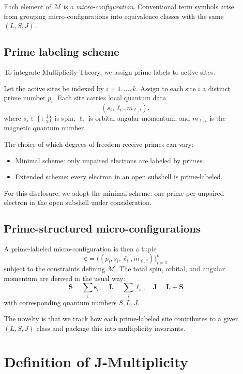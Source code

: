 \documentclass[11pt]{article}
\begin{document}
Each element of \(\mathcal{M}\) is a \emph{micro-configuration}. Conventional term symbols arise from grouping micro-configurations into equivalence classes with the same \((L,S,J)\).

\subsection{Prime labeling scheme}

To integrate Multiplicity Theory, we assign prime labels to active sites.

\begin{definition}
Let the active sites be indexed by \(i=1,\dots,k\). Assign to each site \(i\) a distinct prime number \(p_i\). Each site carries local quantum data
\[
(s_i, \ell_i, m_{\ell,i}),
\]
where \(s_i \in \{\pm \frac{1}{2}\}\) is spin, \(\ell_i\) is orbital angular momentum, and \(m_{\ell,i}\) is the magnetic quantum number.
\end{definition}

The choice of which degrees of freedom receive primes can vary:
\begin{itemize}
  \item Minimal scheme: only unpaired electrons are labeled by primes.
  \item Extended scheme: every electron in an open subshell is prime-labeled.
\end{itemize}

For this disclosure, we adopt the minimal scheme: one prime per unpaired electron in the open subshell under consideration.

\subsection{Prime-structured micro-configurations}

A prime-labeled micro-configuration is then a tuple
\[
\mathbf{c} = \big((p_i, s_i, \ell_i, m_{\ell,i})\big)_{i=1}^k
\]
subject to the constraints defining \(\mathcal{M}\). The total spin, orbital, and angular momentum are derived in the usual way:
\[
\mathbf{S} = \sum_i \mathbf{s}_i,\quad
\mathbf{L} = \sum_i \mathbf{\ell}_i,\quad
\mathbf{J} = \mathbf{L} + \mathbf{S}
\]
with corresponding quantum numbers \(S, L, J\).

The novelty is that we track how each prime-labeled site contributes to a given \((L,S,J)\) class and package this into multiplicity invariants.

\section{Definition of J-Multiplicity}
\end{document}
